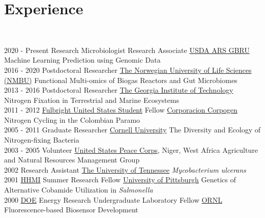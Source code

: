 \documentclass[letterpaper]{twentysecondcv3} %
\begin{document}
\section{Experience}\\
\begin{twenty} %
\twentyitem
    	{2020 -}
		{Present}
        {Research Microbiologist Research Associate}
        {\href{https://www.ars.usda.gov/southeast-area/stoneville-ms/genomics-and-bioinformatics-research/}{USDA ARS GBRU}}
        {Machine Learning Prediction using Genomic Data}\\

    \twentyitem
    	{2016 -}
		{2020}
        {Postdoctoral Researcher}
        {\href{https://www.nmbu.no/}{The Norwegian University of Life Sciences (NMBU)}}
        {Functional Multi-omics of Biogas Reactors and Gut Microbiomes}\\

    \twentyitem
   	{2013 -}
		{2016}
        {Postdoctoral Researcher}
        {\href{https://www.gatech.edu/}{The Georgia Institute of Technology}}
        {Nitrogen Fixation in Terrestrial and Marine Ecosystems}\\

    \twentyitem
   	{2011 -}
		{2012}
        {\href{https://us.fulbrightonline.org/}{Fulbright United States Student} Fellow}
        {\href{https://www.corpogen.org/}{Corporacion Corpogen}}
        {Nitrogen Cycling in the Colombian Paramo}\\

    \twentyitem
   	{2005 -}
		{2011}
        {Graduate Researcher}
        {\href{https://www.cornell.edu/}{Cornell University}}
        {The Diversity and Ecology of Nitrogen-fixing Bacteria}\\

    \twentyitem
   	{2003 -}
		{2005}
        {Volunteer}
        {\href{https://www.peacecorps.gov/}{United States Peace Corps}, Niger, West Africa}
        {Agriculture and Natural Resources Management Group}\\

    \twentyitem
   	{2002}
		{}
        {Research Assistant}
        {\href{https://www.utk.edu/}{The University of Tennessee}}
        {\textit{Mycobacterium ulcerans}}\\

    \twentyitem
   	{2001}
		{}
        {\href{https://www.hhmi.org/}{HHMI} Summer Research Fellow}
        {\href{https://www.pitt.edu/}{University of Pittsburgh}}
        {Genetics of Alternative Cobamide Utilization in \textit{Salmonella}}\\

    \twentyitem
        {2000}
		{}
        {\href{https://www.energy.gov/}{DOE} Energy Research Undergraduate Laboratory Fellow}
        {\href{https://www.ornl.gov/}{ORNL}}
        {Fluorescence-based Biosensor Development}

\end{twenty}
\end{document}
